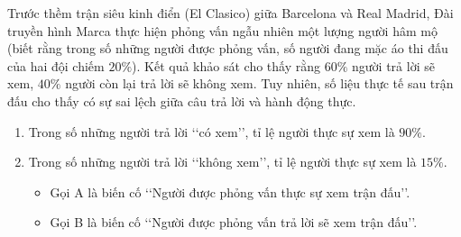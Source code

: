 \begin{ex}%
	Trước thềm trận siêu kinh điển (El Clasico) giữa Barcelona và Real Madrid, Đài truyền hình Marca thực hiện phỏng vấn ngẫu nhiên một lượng người hâm mộ (biết rằng trong số những người được phỏng vấn, số người đang mặc áo thi đấu của hai đội chiếm $20\%$). Kết quả khảo sát cho thấy rằng $60\%$ người trả lời sẽ xem, $40\%$ người còn lại trả lời sẽ không xem. Tuy nhiên, số liệu thực tế sau trận đấu cho thấy có sự sai lệch giữa câu trả lời và hành động thực.
	\begin{enumerate}
	\item[]  Trong số những người trả lời \lq\lq có xem\rq\rq, tỉ lệ người thực sự xem là $90\%$.
	\item[] Trong số những người trả lời \lq\lq không xem\rq\rq, tỉ lệ người thực sự xem là $15\%$.
		\begin{itemize}
		\item  Gọi A là biến cố \lq\lq Người được phỏng vấn thực sự xem trận đấu\rq\rq.
		\item Gọi B là biến cố \lq\lq Người được phỏng vấn trả lời sẽ xem trận đấu\rq\rq.
	\end{itemize}
	\end{enumerate}


\end{ex}

